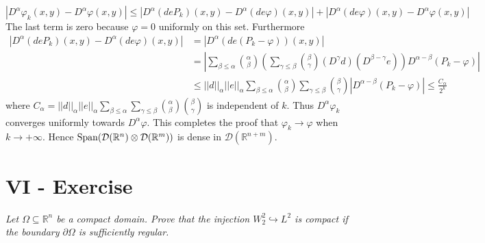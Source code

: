 \documentclass[11pt,a4paper]{article}
\newcommand{\ph}{\varphi}
\newcommand{\il}{\textit}
\newcommand{\R}{\mathbb{R}}
\newcommand{\1}{\mathbbm{1}}
\newcommand{\D}{\mathcal{D}}
\begin{document}
\[ |D^\alpha \ph_k(x,y) - D^\alpha \ph(x,y) | \leq |D^\alpha (deP_k)(x,y) - D^\alpha (de\ph)(x,y) | + |D^\alpha (de\ph)(x,y) - D^\alpha \ph(x,y)| \]
The last term is zero because $\ph =0 $ uniformly on this set. Furthermore
\begin{align*}
|D^\alpha (deP_k)(x,y) - D^\alpha (de\ph)(x,y) | & = |D^\alpha (de(P_k - \ph))(x,y)| \\
& = \left| \sum_{\beta \leq \alpha} \binom{\alpha}{\beta} \left(\sum_{\gamma \leq \beta} \binom{\beta}{\gamma} (D^\gamma d) (D^{\beta - \gamma} e) \right) D^{\alpha - \beta}(P_k - \ph) \right| \\
& \leq ||d||_\alpha ||e||_\alpha \sum_{\beta \leq \alpha} \binom{\alpha}{\beta} \sum_{\gamma \leq \beta} \binom{\beta}{\gamma} | D^{\alpha - \beta} (P_k - \ph) | \leq \frac{C_\alpha}{2^k}
\end{align*}
where $C_\alpha = ||d||_\alpha ||e||_\alpha \sum_{\beta \leq \alpha} \sum_{\gamma \leq \beta} \binom{\alpha}{\beta} \binom{\beta}{\gamma}$ is independent of $k$. Thus $D^\alpha \ph_k$ converges uniformly towards $D^\alpha \ph$. This completes the proof that $\ph_k \to \ph$ when $k \to +\infty$. Hence $\textnormal{Span}(\D(\R^n) \otimes \D(\R^m))$ is dense in $\D(\R^{n+m})$.\newpage
\section*{VI - Exercise}
\il{Let $\Omega \subseteq \R^n$ be a compact domain. Prove that the injection $W^2_2 \hookrightarrow L^2$ is compact if the boundary $\partial\Omega$ is sufficiently regular.}
\end{document}
